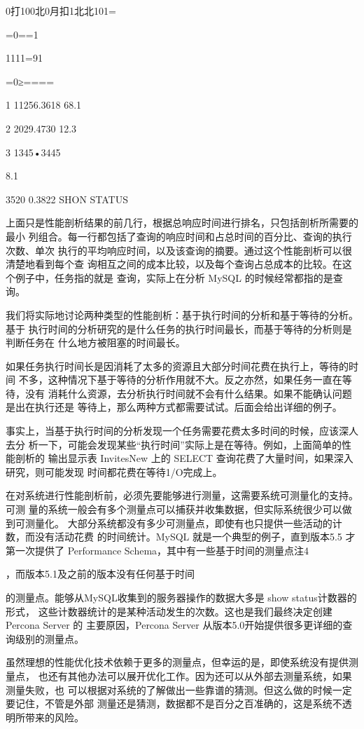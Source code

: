 0打100北0月扣1北北101=

=0==1

1111=91

=0≥====

1 11256.3618 68.1%

2 2029.4730 12.3%

3 1345•3445

8.1%

3520 0.3822 SHON STATUS

上面只是性能剖析结果的前几行，根据总响应时间进行排名，只包括剖析所需要的最小
列组合。每一行都包括了查询的响应时间和占总时间的百分比、查询的执行次数、单次
执行的平均响应时间，以及该查询的摘要。通过这个性能剖析可以很清楚地看到每个查
询相互之间的成本比较，以及每个查询占总成本的比较。在这个例子中，任务指的就是
查询，实际上在分析 MySQL 的时候经常都指的是查询。

我们将实际地讨论两种类型的性能剖析：基于执行时间的分析和基于等待的分析。基于
执行时间的分析研究的是什么任务的执行时间最长，而基于等待的分析则是判断任务在
什么地方被阻塞的时间最长。

如果任务执行时间长是因消耗了太多的资源且大部分时间花费在执行上，等待的时间
不多，这种情况下基于等待的分析作用就不大。反之亦然，如果任务一直在等待，没有
消耗什么资源，去分析执行时间就不会有什么结果。如果不能确认问题是出在执行还是
等待上，那么两种方式都需要试试。后面会给出详细的例子。

事实上，当基于执行时间的分析发现一个任务需要花费太多时间的时候，应该深人去分
析一下，可能会发现某些“执行时间”实际上是在等待。例如，上面简单的性能剖析的
输出显示表 InvitesNew 上的 SELECT 查询花费了大量时间，如果深入研究，则可能发现
时间都花费在等待1/O完成上。

在对系统进行性能剖析前，必须先要能够进行测量，这需要系统可测量化的支持。可测
量的系统一般会有多个测量点可以捕获并收集数据，但实际系统很少可以做到可测量化。
大部分系统都没有多少可测量点，即使有也只提供一些活动的计数，而没有活动花费
的时间统计。MySQL 就是一个典型的例子，直到版本5.5 才第一次提供了 Performance
Schema，其中有一些基于时间的测量点注4

，而版本5.1及之前的版本没有任何基于时间

的测量点。能够从MySQL收集到的服务器操作的数据大多是 show status计数器的形式，
这些计数器统计的是某种活动发生的次数。这也是我们最终决定创建 Percona Server 的
主要原因，Percona Server 从版本5.0开始提供很多更详细的查询级别的测量点。

虽然理想的性能优化技术依赖于更多的测量点，但幸运的是，即使系统没有提供测量点，
也还有其他办法可以展开优化工作。因为还可以从外部去测量系统，如果测量失败，也
可以根据对系统的了解做出一些靠谱的猜测。但这么做的时候一定要记住，不管是外部
测量还是猜测，数据都不是百分之百准确的，这是系统不透明所带来的风险。

